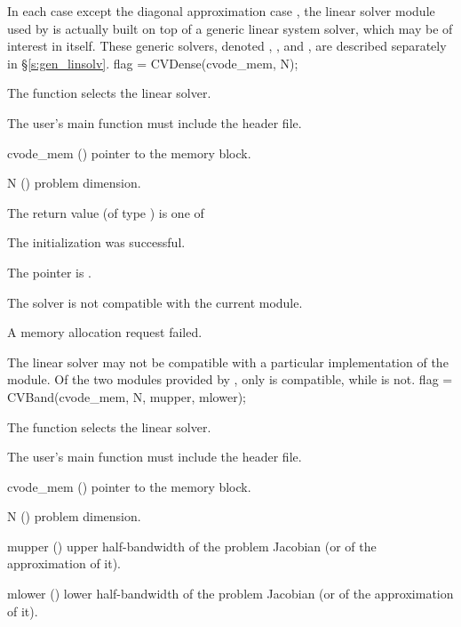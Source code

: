 In each case except the diagonal approximation case {\cvdiag}, the linear
solver module used by {\cvodes} is actually built on top of a generic
linear system solver, which may be of interest in itself.  These
generic solvers, denoted {\dense}, {\band}, and {\spgmr}, are described
separately in \S\ref{s:gen_linsolv}.
{
  flag = CVDense(cvode\_mem, N);
}
{
  The function  selects the {\cvdense} linear solver. 

  The user's main function must include the  header file.
}
{
  \begin{args}
  \item[cvode\_mem] ()
    pointer to the {\cvodes} memory block.
  \item[N] ()
    problem dimension.
  \end{args}
}
{
  The return value  (of type ) is one of
  \begin{args}
  \item[\Id{SUCCESS}] 
    The {\cvdense} initialization was successful.
  \item[\Id{LIN\_NO\_MEM}]
    The  pointer is .
  \item[\Id{LIN\_ILL\_INPUT}]
    The {\cvdense} solver is not compatible with the current {\nvector} module.
  \item[\Id{LMEM\_FAIL}]
    A memory allocation request failed.
  \end{args}
}
{
  The {\cvdense} linear solver may not be compatible with a particular
  implementation of the {\nvector} module. 
  Of the two {\nvector} modules provided by {\sundials}, only {\nvecs} is 
  compatible, while {\nvecp} is not.
}
{
  flag = CVBand(cvode\_mem, N, mupper, mlower);
}
{
  The function  selects the {\cvband} linear solver. 

  The user's main function must include the  header file.
}
{
  \begin{args}
  \item[cvode\_mem] ()
    pointer to the {\cvodes} memory block.
  \item[N] ()
    problem dimension.
  \item[mupper] ()
    upper half-bandwidth of the problem Jacobian (or of the approximation of it).
  \item[mlower] ()
    lower half-bandwidth of the problem Jacobian (or of the approximation of it).
  \end{args}
}
